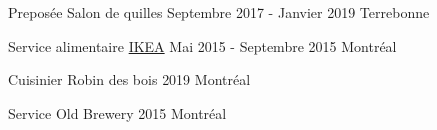 



\begin{cvhonors}

  \cvhonor
    {Preposée} %
    {Salon de quilles} %
    {Septembre 2017 - Janvier 2019} %
    {Terrebonne} %

  \cvhonor
    {Service alimentaire} %
    {\href{https://www.ikea.ca/}{IKEA}} %
    {Mai 2015 - Septembre 2015} %
    {Montréal} %

\end{cvhonors}



\begin{cvhonors}
  \cvhonor
    {Cuisinier} %
    {Robin des bois} %
    {2019} %
    {Montréal} %

  \cvhonor
    {Service} %
    {Old Brewery} %
    {2015} %
    {Montréal} %

\end{cvhonors}




